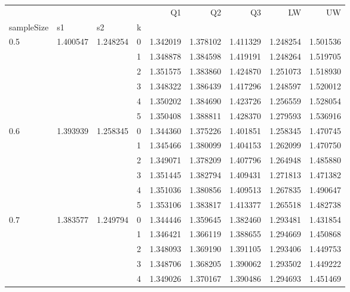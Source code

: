 \begin{tabular}{llllrrrrr}
\toprule
    &          &          &   &        Q1 &        Q2 &        Q3 &        LW &        UW \\
sampleSize & s1 & s2 & k &           &           &           &           &           \\
\midrule
0.5 & 1.400547 & 1.248254 & 0 &  1.342019 &  1.378102 &  1.411329 &  1.248254 &  1.501536 \\
    &          &          & 1 &  1.348878 &  1.384598 &  1.419191 &  1.248264 &  1.519705 \\
    &          &          & 2 &  1.351575 &  1.383860 &  1.424870 &  1.251073 &  1.518930 \\
    &          &          & 3 &  1.348322 &  1.386439 &  1.417296 &  1.248597 &  1.520012 \\
    &          &          & 4 &  1.350202 &  1.384690 &  1.423726 &  1.256559 &  1.528054 \\
    &          &          & 5 &  1.350408 &  1.388811 &  1.428370 &  1.279593 &  1.536916 \\
0.6 & 1.393939 & 1.258345 & 0 &  1.344360 &  1.375226 &  1.401851 &  1.258345 &  1.470745 \\
    &          &          & 1 &  1.345466 &  1.380099 &  1.404153 &  1.262099 &  1.470750 \\
    &          &          & 2 &  1.349071 &  1.378209 &  1.407796 &  1.264948 &  1.485880 \\
    &          &          & 3 &  1.351445 &  1.382794 &  1.409431 &  1.271813 &  1.471382 \\
    &          &          & 4 &  1.351036 &  1.380856 &  1.409513 &  1.267835 &  1.490647 \\
    &          &          & 5 &  1.353106 &  1.383817 &  1.413377 &  1.265518 &  1.482738 \\
0.7 & 1.383577 & 1.249794 & 0 &  1.344446 &  1.359645 &  1.382460 &  1.293481 &  1.431854 \\
    &          &          & 1 &  1.346421 &  1.366119 &  1.388655 &  1.294669 &  1.450868 \\
    &          &          & 2 &  1.348093 &  1.369190 &  1.391105 &  1.293406 &  1.449753 \\
    &          &          & 3 &  1.348706 &  1.368205 &  1.390062 &  1.293502 &  1.449222 \\
    &          &          & 4 &  1.349026 &  1.370167 &  1.390486 &  1.294693 &  1.451469 \\

\end{tabular}
